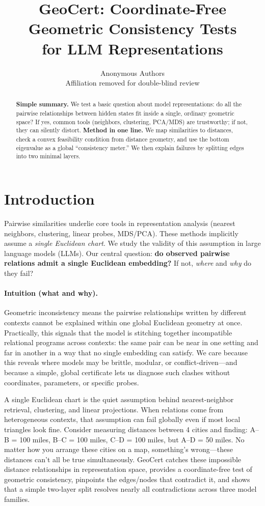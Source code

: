 \documentclass[11pt]{article}
\title{GeoCert: Coordinate-Free Geometric Consistency Tests\\
for LLM Representations}
\author{Anonymous Authors\\
\small Affiliation removed for double-blind review}
\date{}
\newcommand{\1}{\mathbf{1}}
\begin{document}
\maketitle

\begin{abstract}
\textbf{Simple summary.} We test a basic question about model representations: do all the pairwise relationships between hidden states fit inside a single, ordinary geometric space? If yes, common tools (neighbors, clustering, PCA/MDS) are trustworthy; if not, they can silently distort. \textbf{Method in one line.} We map similarities to distances, check a convex feasibility condition from distance geometry, and use the bottom eigenvalue as a global ``consistency meter.'' We then explain failures by splitting edges into two minimal layers.
\end{abstract}

\vspace{-0.5em}
\section{Introduction}
Pairwise similarities underlie core tools in representation analysis (nearest neighbors, clustering, linear probes, MDS/PCA). These methods implicitly assume a \emph{single Euclidean chart}. We study the validity of this assumption in large language models (LLMs). Our central question: \textbf{do observed pairwise relations admit a single Euclidean embedding?} If not, \emph{where} and \emph{why} do they fail?

\paragraph{Intuition (what and why).} Geometric inconsistency means the pairwise relationships written by different contexts cannot be explained within one global Euclidean geometry at once. Practically, this signals that the model is stitching together incompatible relational programs across contexts: the same pair can be near in one setting and far in another in a way that no single embedding can satisfy. We care because this reveals where models may be brittle, modular, or conflict-driven---and because a simple, global certificate lets us diagnose such clashes without coordinates, parameters, or specific probes.

A single Euclidean chart is the quiet assumption behind nearest-neighbor retrieval, clustering, and linear projections. When relations come from heterogeneous contexts, that assumption can fail globally even if most local triangles look fine. Consider measuring distances between 4 cities and finding: A--B = 100 miles, B--C = 100 miles, C--D = 100 miles, but A--D = 50 miles. No matter how you arrange these cities on a map, something's wrong---these distances can't all be true simultaneously. GeoCert catches these impossible distance relationships in representation space, provides a coordinate-free test of geometric consistency, pinpoints the edges/nodes that contradict it, and shows that a simple two-layer split resolves nearly all contradictions across three model families.
\end{document}
